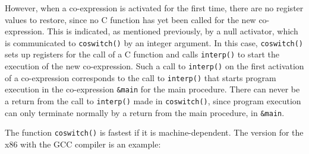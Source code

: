However, when a co-expression is activated for the first time, there
are no register values to restore, since no C function has yet been
called for the new co-expression. This is indicated, as mentioned
previously, by a null activator, which is communicated to
\texttt{coswitch()} by an integer argument. In this case,
\texttt{coswitch()} sets up registers for the call of a C function and
calls \texttt{interp()} to start the execution of the new
co-expression.  Such a call to \texttt{interp()} on the first
activation of a co-expression corresponds to the call to
\texttt{interp()} that starts program execution in the co-expression
\texttt{\&main} for the main procedure. There can never be a return
from the call to \texttt{interp()} made in \texttt{coswitch()}, since
program execution can only terminate normally by a return from the
main procedure, in \texttt{\&main}.

The function \texttt{coswitch()} is fastest if it is
machine-dependent. The version for the x86 with the GCC compiler is an
example:

